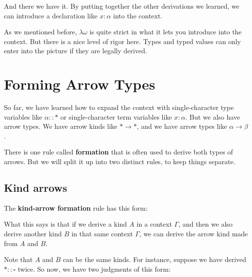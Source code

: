 \documentclass{book}
\numberwithin{equation}{chapter}
\newcommand{\vocab}{\textbf}
\begin{document}
\noindent
And there we have it. By putting together the other derivations we learned, we can introduce a declaration like $x : \alpha$ into the context.

As we mentioned before, $\lambda\omega$ is quite strict in what it lets you introduce into the context. But there is a nice level of rigor here. Types and typed values can only enter into the picture if they are legally derived.


\chapter{Forming Arrow Types}

So far, we have learned how to expand the context with single-character type variables like $\alpha :: \ast$ or single-character term variables like $x : \alpha$. But we also have arrow types. We have arrow kinds like $\ast \rightarrow \ast$, and we have arrow types like $\alpha \rightarrow \beta$. 

There is one rule called \vocab{formation} that is often used to derive both types of arrows. But we will split it up into two distinct rules, to keep things separate.


\section{Kind arrows}

The \vocab{kind-arrow formation} rule has this form:

\begin{prooftree}


\end{prooftree}

\noindent
What this says is that if we derive a kind $A$ in a context $\Gamma$, and then we also derive another kind $B$ in that same context $\Gamma$, we can derive the arrow kind made from $A$ and $B$.

Note that $A$ and $B$ can be the same kinds. For instance, suppose we have derived $\ast :: \square$ twice. So now, we have two judgments of this form:
\end{document}
